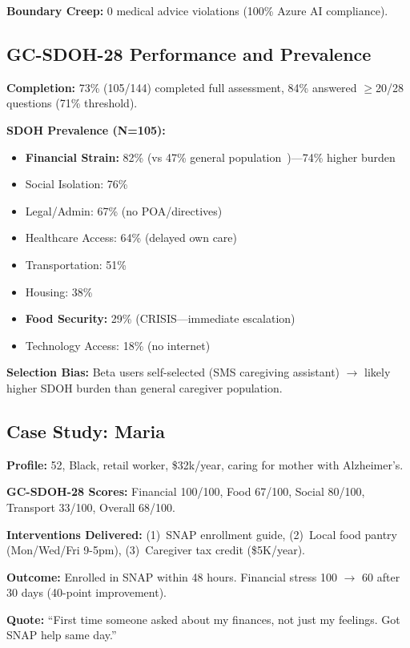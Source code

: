 \documentclass{article}%
\begin{document}
\textbf{Boundary Creep:} 0 medical advice violations (100\% Azure AI compliance).

%
\subsection{GC{-}SDOH{-}28 Performance and Prevalence}%
\label{subsec:GC{-}SDOH{-}28PerformanceandPrevalence}%
\textbf{Completion:} 73\% (105/144) completed full assessment, 84\% answered $\geq$20/28 questions (71\% threshold).

\textbf{SDOH Prevalence (N=105):}
\begin{itemize}
    \item \textbf{Financial Strain:} 82\% (vs 47\% general population~\cite{aarp2025})—74\% higher burden
    \item Social Isolation: 76\%
    \item Legal/Admin: 67\% (no POA/directives)
    \item Healthcare Access: 64\% (delayed own care)
    \item Transportation: 51\%
    \item Housing: 38\%
    \item \textbf{Food Security:} 29\% (CRISIS—immediate escalation)
    \item Technology Access: 18\% (no internet)
\end{itemize}

\textbf{Selection Bias:} Beta users self-selected (SMS caregiving assistant) $\rightarrow$ likely higher SDOH burden than general caregiver population.

%
\subsection{Case Study: Maria}%
\label{subsec:CaseStudyMaria}%
\textbf{Profile:} 52, Black, retail worker, \$32k/year, caring for mother with Alzheimer's.

\textbf{GC-SDOH-28 Scores:} Financial 100/100, Food 67/100, Social 80/100, Transport 33/100, Overall 68/100.

\textbf{Interventions Delivered:} (1)~SNAP enrollment guide, (2)~Local food pantry (Mon/Wed/Fri 9-5pm), (3)~Caregiver tax credit (\$5K/year).

\textbf{Outcome:} Enrolled in SNAP within 48 hours. Financial stress 100 $\rightarrow$ 60 after 30 days (40-point improvement).

\textbf{Quote:} ``First time someone asked about my finances, not just my feelings. Got SNAP help same day.''
\end{document}
